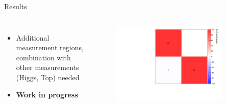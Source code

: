 \begin{frame}{Results}
\begin{columns}
\begin{itemize}
    \item Additional measurement regions, combination with other measurements (Higgs, Top) needed
    \item \textcolor{HHred}{\textbf{Work in progress}}
\end{itemize}

\begin{figure}
    \centering
    \includegraphics[width=0.85\textwidth]{Part5/Img/correlationHist_fit_eigvec_asimov.pdf}
\end{figure}

\end{columns}    
\end{frame}